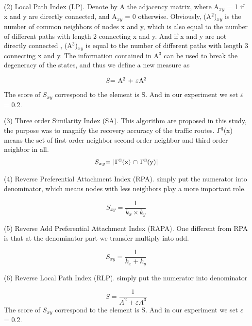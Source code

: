 \documentclass[onecolumn,preprintnumbers,amsmath,amssymb]{revtex4}
\begin{document}
(2) Local Path Index (LP)\cite{AC,LI}. Denote by A the adjacency matrix, where A$_x$$_y$ = 1 if x and y are directly connected, and A$_x$$_y$ = 0 otherwise. Obviously, (A$^2$)$_x$$_y$ is the number of common neighbors of nodes x and y, which is also equal to the number of different paths with length 2 connecting x and y. And if x and y are not directly connected , (A$^3$)$_x$$_y$ is equal to the number of different paths with length 3 connecting x and y. The information contained in A$^3$ can be used to break the degeneracy of the states, and thus we define a new measure as

\begin{equation}
\centerline{
$S$=
A$^2$ + $\varepsilon$A$^3$
}
\end{equation}
The score of $S_x$$_y$ correspond to the element is S. And in our experiment we set 
$\varepsilon$= 0.2.


(3) Three order Similarity Index (SA). This algorithm are proposed in this study, the purpose was to magnify the recovery accuracy of the traffic routes. $\Gamma$$^3$(x) means the set of first order neighbor second order neighbor and third order neighbor in all.
\begin{equation}
\centerline{
$S_x$$_y$=
$|$$\Gamma$$^3$(x) $\cap$ $\Gamma$$^3$(y)$|$
}
\end{equation}


(4) Reverse Preferential Attachment Index (RPA). simply put the numerator into denominator, which means nodes with less neighbors play a more important role.


\begin{equation}
S_{xy}=\frac{1}{k_x \times k_y}
\end{equation}

(5) Reverse Add Preferential Attachment Index (RAPA). One different from RPA is that at the denominator part we transfer multiply into add.


\begin{equation}
S_{xy}=\frac{1}{k_x + k_y}
\end{equation}

(6) Reverse Local Path Index (RLP). simply put the numerator into denominator

\begin{equation}
S=\frac{1}{A^2 + \varepsilon A^3}
\end{equation}
The score of $S_x$$_y$ correspond to the element is S. And in our experiment we set 
$\varepsilon$= 0.2.
\end{document}
